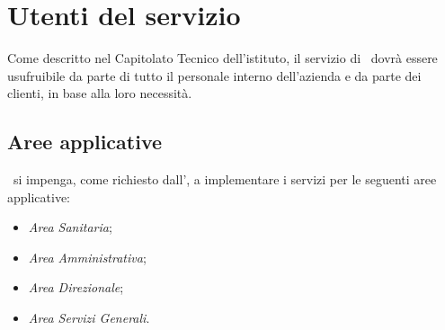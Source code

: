 	\newpage
	

\section{Utenti del servizio}\label{sec:utenti}

	Come descritto nel Capitolato Tecnico dell'istituto, il servizio di \helpdesk~dovrà essere usufruibile da parte di tutto il personale interno dell'azienda e da parte dei clienti, in base alla loro necessità.
	

	\subsection{Aree applicative}
	
		\azienda~si impenga, come richiesto dall'\istituto, a implementare i servizi per le seguenti aree applicative:
		\begin{itemize}[noitemsep]
			\item \textit{Area Sanitaria};
			\item \textit{Area Amministrativa};
			\item \textit{Area Direzionale};
			\item \textit{Area Servizi Generali}.
		\end{itemize}
	
